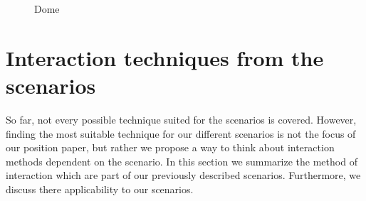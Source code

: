 \documentclass[review,journal]{vgtc}         %
\begin{document}
\begin{figure}[htb]
	\centering
	\caption{Dome}
	\label{img:dome_clip}
\end{figure}


\section{Interaction techniques from the scenarios} \label{sec:techniques}

So far, not every possible technique suited for the scenarios is covered. However, finding the most suitable technique for our different scenarios is not the focus of our position paper, but rather we propose a way to think about interaction methods dependent on the scenario. In this section we summarize the method of interaction which are part of our previously described scenarios. Furthermore, we discuss there applicability to our scenarios.
\end{document}

